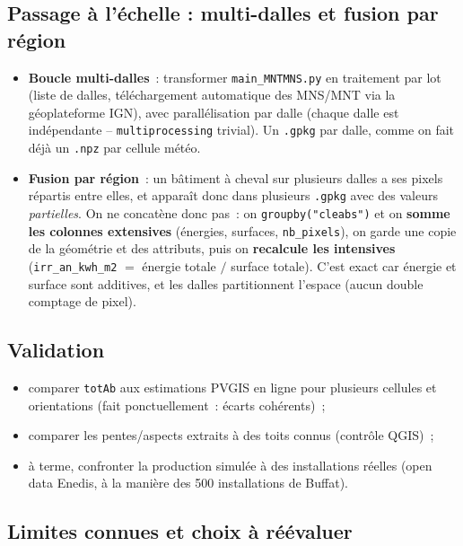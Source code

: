 \documentclass[11pt,a4paper]{article}
\newcommand{\fichier}[1]{\texttt{#1}}
\newcommand{\fonction}[1]{\texttt{#1}}
\begin{document}
\subsection{Passage à l'échelle : multi-dalles et fusion par région}

\begin{itemize}
  \item \textbf{Boucle multi-dalles}~: transformer \fichier{main\_MNTMNS.py} en
    traitement par lot (liste de dalles, téléchargement automatique des MNS/MNT
    via la géoplateforme IGN), avec parallélisation par dalle (chaque dalle est
    indépendante -- \fonction{multiprocessing} trivial). Un \fichier{.gpkg} par
    dalle, comme on fait déjà un \fichier{.npz} par cellule météo.
  \item \textbf{Fusion par région}~: un bâtiment à cheval sur plusieurs dalles a
    ses pixels répartis entre elles, et apparaît donc dans plusieurs
    \fichier{.gpkg} avec des valeurs \emph{partielles}. On ne concatène donc pas~:
    on \fonction{groupby("cleabs")} et on \textbf{somme les colonnes extensives}
    (énergies, surfaces, \fichier{nb\_pixels}), on garde une copie de la géométrie
    et des attributs, puis on \textbf{recalcule les intensives}
    (\fichier{irr\_an\_kwh\_m2} $=$ énergie totale $/$ surface totale). C'est
    exact car énergie et surface sont additives, et les dalles partitionnent
    l'espace (aucun double comptage de pixel).
\end{itemize}

\subsection{Validation}

\begin{itemize}
  \item comparer \fonction{totAb} aux estimations PVGIS en ligne pour plusieurs
    cellules et orientations (fait ponctuellement~: écarts cohérents)~;
  \item comparer les pentes/aspects extraits à des toits connus (contrôle QGIS)~;
  \item à terme, confronter la production simulée à des installations réelles
    (open data Enedis, à la manière des 500 installations de Buffat).
\end{itemize}

\subsection{Limites connues et choix à réévaluer}
\label{sec:limites}
\end{document}
